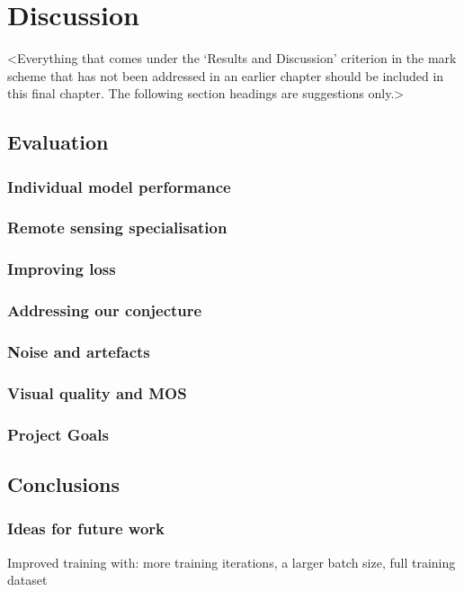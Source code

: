 \chapter{Discussion}
\label{chapter4}

<Everything that comes under the `Results and Discussion' criterion in the mark scheme that has not been addressed in an earlier chapter should be included in this final chapter. The following section headings are suggestions only.>

\section{Evaluation}
\subsection{Individual model performance}

\subsection{Remote sensing specialisation}

\subsection{Improving loss}

\subsection{Addressing our conjecture}

\subsection{Noise and artefacts}

\subsection{Visual quality and MOS}

\subsection{Project Goals}

\section{Conclusions}

\subsection{Ideas for future work}
Improved training with: more training iterations, a larger batch size, full training dataset

